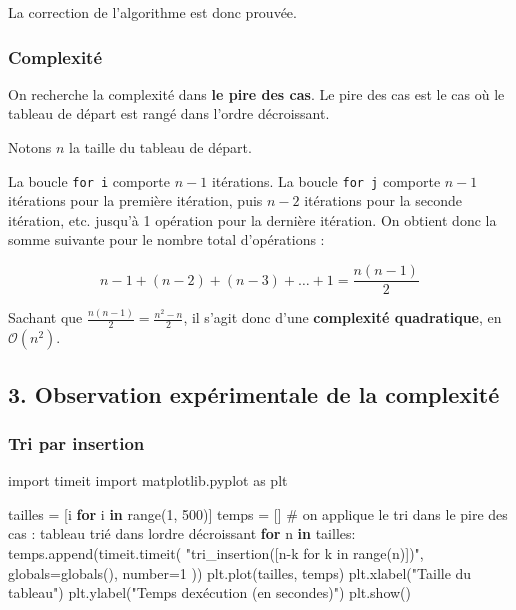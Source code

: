 \documentclass[
  french,
  a4paper,
  DIV=11,
  numbers=noendperiod]{scrartcl}
\newenvironment{Shaded}{\begin{snugshade}}{\end{snugshade}}
\newcommand{\BuiltInTok}[1]{\textcolor[rgb]{0.00,0.23,0.31}{#1}}
\newcommand{\CommentTok}[1]{\textcolor[rgb]{0.37,0.37,0.37}{#1}}
\newcommand{\ControlFlowTok}[1]{\textcolor[rgb]{0.00,0.23,0.31}{\textbf{#1}}}
\newcommand{\DecValTok}[1]{\textcolor[rgb]{0.68,0.00,0.00}{#1}}
\newcommand{\ImportTok}[1]{\textcolor[rgb]{0.00,0.46,0.62}{#1}}
\newcommand{\KeywordTok}[1]{\textcolor[rgb]{0.00,0.23,0.31}{\textbf{#1}}}
\newcommand{\NormalTok}[1]{\textcolor[rgb]{0.00,0.23,0.31}{#1}}
\newcommand{\OperatorTok}[1]{\textcolor[rgb]{0.37,0.37,0.37}{#1}}
\newcommand{\StringTok}[1]{\textcolor[rgb]{0.13,0.47,0.30}{#1}}
\begin{document}
La correction de l'algorithme est donc prouvée.

\subsubsection{Complexité}\label{complexituxe9-1}

On recherche la complexité dans \textbf{le pire des cas}. Le pire des
cas est le cas où le tableau de départ est rangé dans l'ordre
décroissant.

Notons \(n\) la taille du tableau de départ.

La boucle \texttt{for\ i} comporte \(n-1\) itérations. La boucle
\texttt{for\ j} comporte \(n-1\) itérations pour la première itération,
puis \(n-2\) itérations pour la seconde itération, etc. jusqu'à 1
opération pour la dernière itération. On obtient donc la somme suivante
pour le nombre total d'opérations :

\[n-1+(n-2)+(n-3)+\ldots+1=\frac{n(n-1)}{2}\]

Sachant que \(\frac{n(n-1)}{2} = \frac{n^2-n}{2}\), il s'agit donc d'une
\textbf{complexité quadratique}, en \(\mathcal{O}(n^2)\).

\subsection{3. Observation expérimentale de la
complexité}\label{observation-expuxe9rimentale-de-la-complexituxe9}

\subsubsection{Tri par insertion}\label{tri-par-insertion-1}

\begin{Shaded}
\begin{Highlighting}[]
\ImportTok{import}\NormalTok{ timeit}
\ImportTok{import}\NormalTok{ matplotlib.pyplot }\ImportTok{as}\NormalTok{ plt}

\NormalTok{tailles }\OperatorTok{=}\NormalTok{ [i }\ControlFlowTok{for}\NormalTok{ i }\KeywordTok{in} \BuiltInTok{range}\NormalTok{(}\DecValTok{1}\NormalTok{, }\DecValTok{500}\NormalTok{)]}
\NormalTok{temps }\OperatorTok{=}\NormalTok{ []}
\CommentTok{\# on applique le tri dans le pire des cas : tableau trié dans l\textquotesingle{}ordre décroissant}
\ControlFlowTok{for}\NormalTok{ n }\KeywordTok{in}\NormalTok{ tailles:}
\NormalTok{    temps.append(timeit.timeit(}
        \StringTok{"tri\_insertion([n{-}k for k in range(n)])"}\NormalTok{,}
        \BuiltInTok{globals}\OperatorTok{=}\BuiltInTok{globals}\NormalTok{(),}
\NormalTok{        number}\OperatorTok{=}\DecValTok{1}
\NormalTok{    ))}
\NormalTok{plt.plot(tailles, temps)}
\NormalTok{plt.xlabel(}\StringTok{"Taille du tableau"}\NormalTok{)}
\NormalTok{plt.ylabel(}\StringTok{"Temps d\textquotesingle{}exécution (en secondes)"}\NormalTok{)}
\NormalTok{plt.show()}
\end{Highlighting}
\end{Shaded}
\end{document}
